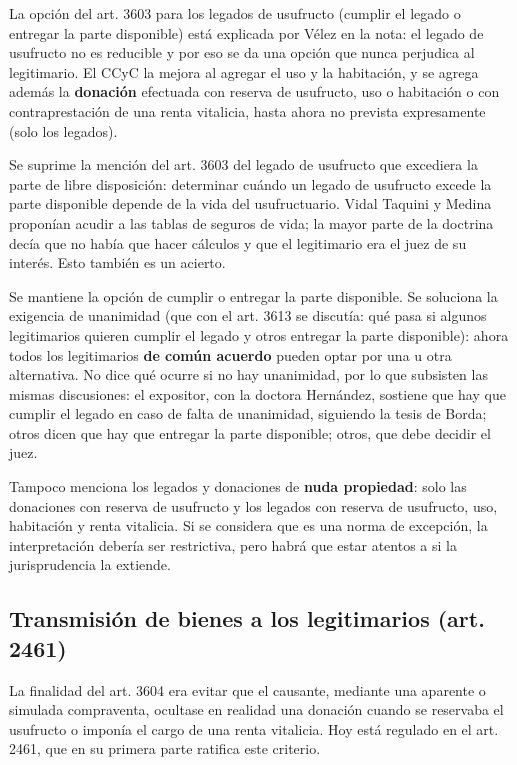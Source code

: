 \documentclass[12pt,oneside]{book}
\begin{document}
La opción del art. 3603 para los legados de usufructo (cumplir el legado o entregar la parte disponible) está explicada por Vélez en la nota: el legado de usufructo no es reducible y por eso se da una opción que nunca perjudica al legitimario. El CCyC la mejora al agregar el uso y la habitación, y se agrega además la \textbf{donación} efectuada con reserva de usufructo, uso o habitación o con contraprestación de una renta vitalicia, hasta ahora no prevista expresamente (solo los legados).

Se suprime la mención del art. 3603 del legado de usufructo que excediera la parte de libre disposición: determinar cuándo un legado de usufructo excede la parte disponible depende de la vida del usufructuario. Vidal Taquini y Medina proponían acudir a las tablas de seguros de vida; la mayor parte de la doctrina decía que no había que hacer cálculos y que el legitimario era el juez de su interés. Esto también es un acierto.

Se mantiene la opción de cumplir o entregar la parte disponible. Se soluciona la exigencia de unanimidad (que con el art. 3613 se discutía: qué pasa si algunos legitimarios quieren cumplir el legado y otros entregar la parte disponible): ahora todos los legitimarios \textbf{de común acuerdo} pueden optar por una u otra alternativa. No dice qué ocurre si no hay unanimidad, por lo que subsisten las mismas discusiones: el expositor, con la doctora Hernández, sostiene que hay que cumplir el legado en caso de falta de unanimidad, siguiendo la tesis de Borda; otros dicen que hay que entregar la parte disponible; otros, que debe decidir el juez.

Tampoco menciona los legados y donaciones de \textbf{nuda propiedad}: solo las donaciones con reserva de usufructo y los legados con reserva de usufructo, uso, habitación y renta vitalicia. Si se considera que es una norma de excepción, la interpretación debería ser restrictiva, pero habrá que estar atentos a si la jurisprudencia la extiende.

\subsection{Transmisión de bienes a los legitimarios (art. 2461)}

La finalidad del art. 3604 era evitar que el causante, mediante una aparente o simulada compraventa, ocultase en realidad una donación cuando se reservaba el usufructo o imponía el cargo de una renta vitalicia. Hoy está regulado en el art. 2461, que en su primera parte ratifica este criterio.
\end{document}
